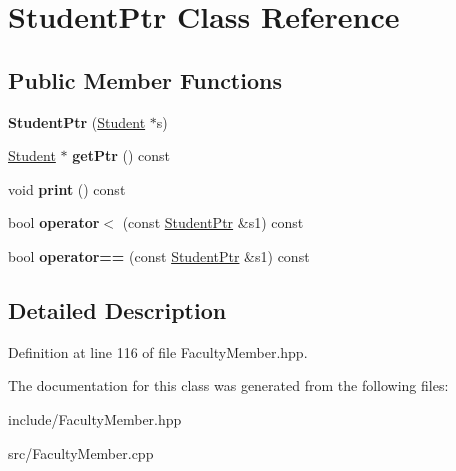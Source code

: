 \hypertarget{classStudentPtr}{}\section{Student\+Ptr Class Reference}
\label{classStudentPtr}
\subsection*{Public Member Functions}
\begin{DoxyCompactItemize}
\item 
\mbox{\label{classStudentPtr_a9e9b100f8bd5978b3eb07299d62d9202}} 
{\bfseries Student\+Ptr} (\hyperlink{classStudent}{Student} $\ast$s)
\item 
\mbox{\label{classStudentPtr_a6274fd86457eba16361c8bcf45cf1184}} 
\hyperlink{classStudent}{Student} $\ast$ {\bfseries get\+Ptr} () const
\item 
\mbox{\label{classStudentPtr_ab66466487798e421390290c0eae31757}} 
void {\bfseries print} () const
\item 
\mbox{\label{classStudentPtr_ab2e10ac137df65b568bfc7b3bb800b53}} 
bool {\bfseries operator$<$} (const \hyperlink{classStudentPtr}{Student\+Ptr} \&s1) const
\item 
\mbox{\label{classStudentPtr_a0dcd1136bd074769f38f36f4931aace4}} 
bool {\bfseries operator==} (const \hyperlink{classStudentPtr}{Student\+Ptr} \&s1) const
\end{DoxyCompactItemize}


\subsection{Detailed Description}


Definition at line 116 of file Faculty\+Member.\+hpp.



The documentation for this class was generated from the following files\+:\begin{DoxyCompactItemize}
\item 
include/Faculty\+Member.\+hpp\item 
src/Faculty\+Member.\+cpp\end{DoxyCompactItemize}
